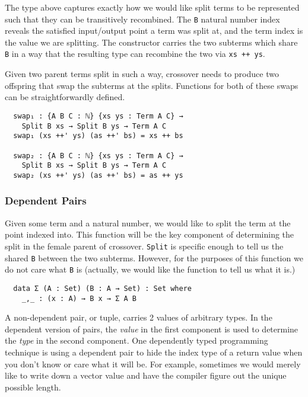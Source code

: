 \documentclass{acm_proc_article-sp}
\begin{document}
The type above captures exactly how we would like split terms to be
represented such that they can be transitively recombined. The
\texttt{B} natural number index reveals the satisfied
input/output point a term was split at, and the term index is the
value we are splitting. The constructor carries the two
subterms which share \texttt{B} in a way that the resulting type can
recombine the two via \texttt{xs ++ ys}.

Given two parent terms split in such a way, crossover needs to produce
two offspring that swap the subterms at the splits. Functions for both
of these swaps can be straightforwardly defined.

\begin{verbatim}
  swap₁ : {A B C : ℕ} {xs ys : Term A C} →
    Split B xs → Split B ys → Term A C
  swap₁ (xs ++' ys) (as ++' bs) = xs ++ bs

  swap₂ : {A B C : ℕ} {xs ys : Term A C} →
    Split B xs → Split B ys → Term A C
  swap₂ (xs ++' ys) (as ++' bs) = as ++ ys
\end{verbatim}

\subsubsection{Dependent Pairs}

Given some term and a natural number, we would like to split the term
at the point indexed into. This function will be the key component of
determining the split in the female parent of
crossover. \texttt{Split} is specific enough to tell us the shared
\texttt{B} between the two subterms. However, for the purposes of this
function we do not care what \texttt{B} is (actually, we would like
the function to tell us what it is.)

\begin{verbatim}
  data Σ (A : Set) (B : A → Set) : Set where
    _,_ : (x : A) → B x → Σ A B
\end{verbatim}

A non-dependent pair, or tuple, carries 2 values of arbitrary
types. In the dependent version of pairs, the \textit{value} in the first
component is used to determine the \textit{type} in the second
component. One dependently typed programming technique is using a
dependent pair to hide the index type of a return value when you don't
know or care what it will be. For example, sometimes we would merely
like to write down a vector value and have the compiler figure out the
unique possible length.
\end{document}
